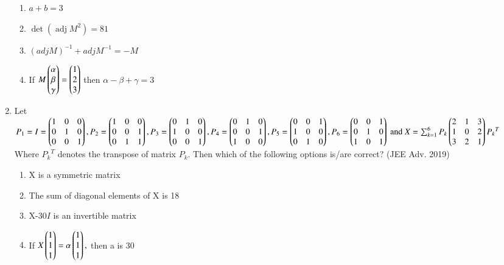 \documentclass[journal,12pt,twocolumn]{IEEEtran}
\theoremstyle{remark}
\begin{document}
\begin{enumerate}
\begin{enumerate}
    \item $a+b=3$
    \item $\mathop{det}(\mathop{adj}M^2)=81$
    \item $(adjM)^{-1}+adjM^{-1}=-M$
    \item If $M\begin{pmatrix}
        \alpha\\
        \beta\\
        \gamma
\end{pmatrix} = \begin{pmatrix}
        1\\
        2\\
        3
\end{pmatrix}$ then $\alpha-\beta+\gamma=3$\\[2pt]
\end{enumerate}

\item Let\\
$
P_1=I=\begin{pmatrix}
    1 & 0 & 0\\
    0 & 1 & 0\\
    0 & 0 & 1
\end{pmatrix}, P_2 = \begin{pmatrix}
    1 & 0 & 0\\
    0 & 0 & 1\\
    0 & 1 & 1
\end{pmatrix}, P_3 = \begin{pmatrix}
    0 & 1 & 0\\
    1 & 0 & 0\\
    0 & 0 & 1
\end{pmatrix}, P_4 = \begin{pmatrix}
    0 & 1 & 0\\
    0 & 0 & 1\\
    1 & 0 & 0
\end{pmatrix}, P_5 = \begin{pmatrix}
    0 & 0 & 1\\
    1 & 0 & 0\\
    0 & 1 & 0
\end{pmatrix}, P_6 = \begin{pmatrix}
    0 & 0 & 1\\
    0 & 1 & 0\\
    1 & 0 & 1
\end{pmatrix}
\text{ and } X = \sum_{k=1}^{6}P_k\begin{pmatrix}
    2 & 1 & 3\\
    1 & 0 & 2\\
    3 & 2 & 1
\end{pmatrix}{P_k}^T$\\Where ${P_k}^T$ denotes the transpose of matrix $P_k$. Then which of the following options is/are correct? \hfill (JEE Adv. 2019)

\begin{enumerate}
	\item X is a symmetric matrix
	\item The sum of diagonal elements of X is 18
	\item X-30$I$ is an invertible matrix
	\item If $X\begin{pmatrix}1\\1\\1\end{pmatrix}=\alpha\begin{pmatrix}1\\1\\1\end{pmatrix},$ then a is 30\\[2pt]
\end{enumerate}


\end{enumerate}
\end{document}
